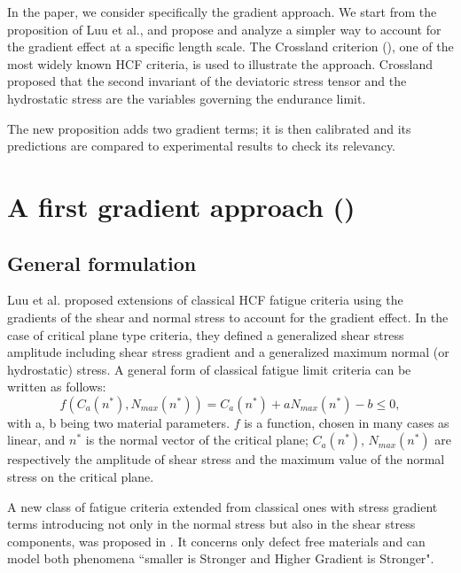 In the paper, we consider specifically the gradient approach. We start from the proposition of Luu et al., and propose and analyze a simpler way to account for the gradient effect at a specific length scale. The Crossland criterion (\cite{crossland1956effect}), one of the most widely known HCF criteria, is used to illustrate the approach. Crossland proposed that the second invariant of the deviatoric stress tensor and the hydrostatic stress are the variables governing the endurance limit. 

The new proposition adds two gradient terms; it is then calibrated and its predictions are compared to experimental results to check its relevancy.


\section{A first gradient approach (\cite{luu2014formulation})}
\subsection{General formulation}

Luu et al. \cite{luu2014formulation} proposed extensions of classical HCF fatigue criteria using the gradients of the shear and normal stress to account for the gradient effect. In the case of critical plane type criteria, they defined a generalized shear stress amplitude including shear stress gradient and a generalized maximum normal (or hydrostatic) stress.
A general form of classical fatigue limit criteria can be written as follows:
\begin{equation}
	\label{eq:classical}
	f(C_a(n^*),N_{max}(n^*))=C_a(n^*)+aN_{max}(n^*)-b\leqslant 0 ,
\end{equation}
with a, b being two material parameters. $f$ is a function, chosen in many cases as linear, and $n^*$ is the normal vector of the critical plane; $C_a(n^* )$, $N_{max} (n^* )$ are respectively the amplitude of shear stress and the maximum value of the normal stress on the critical plane.

A new class of fatigue criteria extended from classical ones with stress gradient terms introducing not only in the normal stress but also in the shear stress components, was proposed in \cite{luu2014formulation}. It concerns only defect free materials and can model both phenomena ``smaller is Stronger and Higher Gradient is Stronger". 

